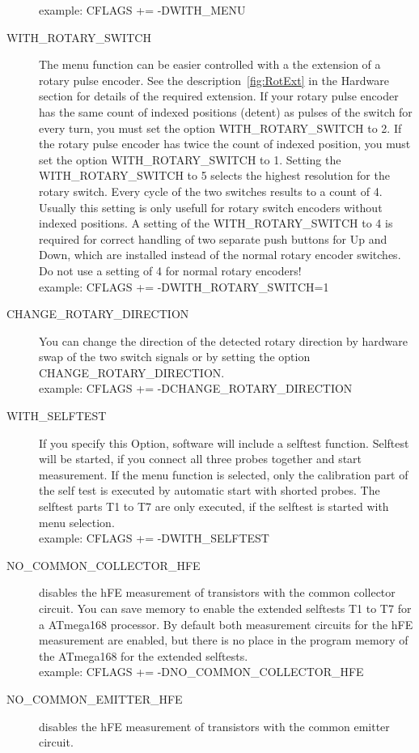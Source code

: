 \begin{description}
example: CFLAGS += -DWITH\_MENU
  \item[WITH\_ROTARY\_SWITCH] The menu function can be easier controlled with a the extension of a rotary pulse encoder.
See the description~\ref{fig:RotExt} in the Hardware section for details of the required extension.
If your rotary pulse encoder has the same count of indexed positions (detent) as pulses of the switch for every turn, you must
set the  option WITH\_ROTARY\_SWITCH to 2. If the rotary pulse encoder has twice the count of indexed position, you must
set the option WITH\_ROTARY\_SWITCH to 1.
Setting the WITH\_ROTARY\_SWITCH to 5 selects the highest resolution for the rotary switch. Every cycle of the two switches results
to a count of 4. Usually this setting is only usefull for rotary switch encoders without indexed positions.
A setting of the WITH\_ROTARY\_SWITCH to 4 is required for correct handling of two separate push buttons for Up and Down,
which are installed instead of the normal rotary encoder switches.
Do not use a setting of 4 for normal rotary encoders!\\
example: CFLAGS += -DWITH\_ROTARY\_SWITCH=1
  \item[CHANGE\_ROTARY\_DIRECTION] You can change the direction of the detected rotary direction by hardware swap of
the two switch signals or by setting the option CHANGE\_ROTARY\_DIRECTION.\\
example: CFLAGS += -DCHANGE\_ROTARY\_DIRECTION
  \item[WITH\_SELFTEST] If you specify this Option, software will include a selftest function.
Selftest will be started, if you connect all three probes together and start measurement.
If the menu function is selected, only the calibration part of the self test is executed by automatic start with
shorted probes. The selftest parts T1 to T7 are only executed, if the selftest is started with menu selection.\\
example: CFLAGS += -DWITH\_SELFTEST
  \item[NO\_COMMON\_COLLECTOR\_HFE] disables the hFE measurement of transistors with the common collector circuit.
You can save memory to enable the extended selftests T1 to T7 for a ATmega168 processor.
By default both measurement circuits for the hFE measurement are enabled, 
but there is no place in the program memory of the ATmega168 for the extended selftests.\\
example: CFLAGS += -DNO\_COMMON\_COLLECTOR\_HFE
  \item[NO\_COMMON\_EMITTER\_HFE] disables the hFE measurement of transistors with the common emitter circuit.

\end{description}
